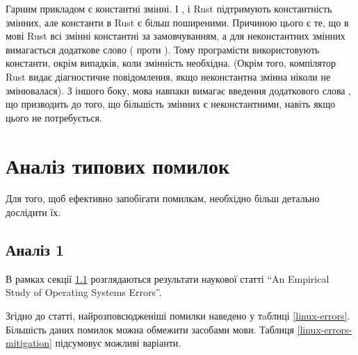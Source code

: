\documentclass[main.tex]{subfiles}
\begin{document}
Гарним прикладом є константні змінні. І \LangC{}, і Rust підтримують константність змінних, але константи в Rust є більш поширеними. Причиною цього є те, що в мові Rust всі змінні константні за замовчуванням, а для неконстантних змінних вимагається додаткове слово ( проти ). Тому програмісти використовують константи, окрім випадків, коли змінність необхідна. (Окрім того, компілятор Rust видає діагностичне повідомлення, якщо неконстантна змінна ніколи не змінювалася). З іншого боку, мова \LangC{} навпаки вимагає введення додаткового слова , що призводить до того, що більшість змінних є неконстантними, навіть якщо цього не потребується.


\section{Аналіз типових помилок}
Для того, щоб ефективно запобігати помилкам, необхідно більш детально дослідити їх.

\FloatBarrier
\subsection{Аналіз 1}\label{errors:os}
В рамках секції \ref{errors:os} розглядаються результати наукової статті ``An Empirical Study of Operating Systems Errors''\cite{an-empirical-study-of-operating-systems-errors}.

Згідно до статті, найрозповсюдженіші помилки наведено у тaблиці \ref{linux-errors}.
Більшість даних помилок можна обмежити засобами мови. Таблиця \ref{linux-errors-mitigation} підсумовує можливі варіанти.
\end{document}
